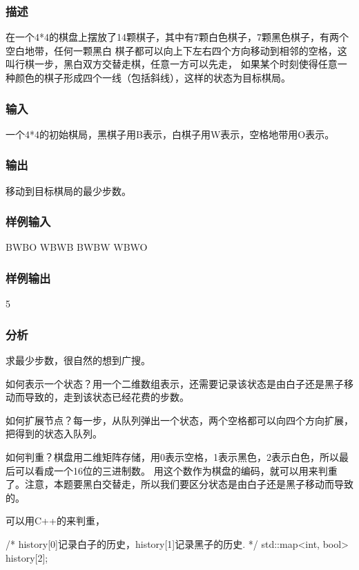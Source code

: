 \subsubsection{描述}
在一个4*4的棋盘上摆放了14颗棋子，其中有7颗白色棋子，7颗黑色棋子，有两个空白地带，任何一颗黑白
棋子都可以向上下左右四个方向移动到相邻的空格，这叫行棋一步，黑白双方交替走棋，任意一方可以先走，
如果某个时刻使得任意一种颜色的棋子形成四个一线（包括斜线），这样的状态为目标棋局。

\subsubsection{输入}
一个4*4的初始棋局，黑棋子用B表示，白棋子用W表示，空格地带用O表示。

\subsubsection{输出}
移动到目标棋局的最少步数。

\subsubsection{样例输入}
\begin{Code}
BWBO
WBWB
BWBW
WBWO
\end{Code}

\subsubsection{样例输出}
\begin{Code}
5
\end{Code}

\subsubsection{分析}
求最少步数，很自然的想到广搜。

如何表示一个状态？用一个二维数组表示，还需要记录该状态是由白子还是黑子移动而导致的，走到该状态已经花费的步数。

如何扩展节点？每一步，从队列弹出一个状态，两个空格都可以向四个方向扩展，把得到的状态入队列。

如何判重？棋盘用二维矩阵存储，用0表示空格，1表示黑色，2表示白色，所以最后可以看成一个16位的三进制数。
用这个数作为棋盘的编码，就可以用来判重了。注意，本题要黑白交替走，所以我们要区分状态是由白子还是黑子移动而导致的。

可以用C++的来判重，
\begin{Code}
/* history[0]记录白子的历史，history[1]记录黑子的历史. */
std::map<int, bool> history[2];
\end{Code}

